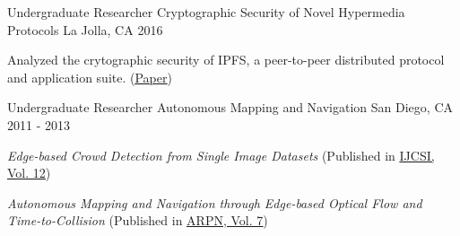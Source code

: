 
\begin{cventries}
  \cventry
    {Undergraduate Researcher} %
    {Cryptographic Security of Novel Hypermedia Protocols} %
    {La Jolla, CA} %
    {2016} %
    {
      \begin{cvitems} %
        \item {Analyzed the crytographic security of IPFS, a peer-to-peer distributed protocol and application suite. (\underline{\href{https://madhuvk.com/ipfs_security.pdf}{Paper}})}
      \end{cvitems}
    }
    
  \cventry
    {Undergraduate Researcher} %
    {Autonomous Mapping and Navigation} %
    {San Diego, CA} %
    {2011 - 2013} %
    {
      \begin{cvitems} %
        \item \textit{Edge-based Crowd Detection from Single Image Datasets}
        (Published in \underline{\href{https://ijcsi.org/papers/IJCSI-12-1-1-18-22.pdf}{IJCSI, Vol. 12}})
        \item \textit{Autonomous Mapping and Navigation through Edge-based Optical Flow and Time-to-Collision}
        (Published in \underline{\href{https://www.arpnjournals.com/jeas/research_papers/rp_2012/jeas_1212_836.pdf}{ARPN, Vol. 7}})
      \end{cvitems}
    }
    
\end{cventries}
